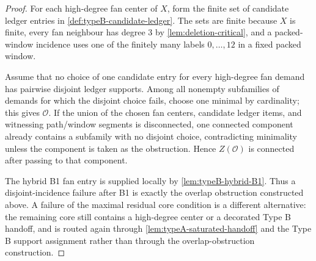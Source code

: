 \documentclass[11pt]{article}
\begin{document}
\begin{proof}
For each high-degree fan center of $X$, form the finite set of candidate ledger
entries in \cref{def:typeB-candidate-ledger}.  The sets are finite because $X$
is finite, every fan neighbour has degree $3$ by \cref{lem:deletion-critical},
and a packed-window incidence uses one of the finitely many labels
$0,\ldots,12$ in a fixed packed window.

Assume that no choice of one candidate entry for every high-degree fan demand
has pairwise disjoint ledger supports.  Among all nonempty subfamilies of demands for
which the disjoint choice fails, choose one minimal by cardinality; this gives
$\mathcal O$.  If the union of the chosen fan centers, candidate ledger items, and
witnessing path/window segments is disconnected, one connected component already
contains a subfamily with no disjoint choice, contradicting minimality unless
the component is taken as the obstruction.  Hence $Z(\mathcal O)$ is connected
after passing to that component.

The hybrid B1 fan entry is supplied locally by
\cref{lem:typeB-hybrid-B1}.  Thus a disjoint-incidence failure after B1 is exactly
the overlap obstruction constructed above.  A failure of the maximal residual
core condition is a different alternative: the remaining core still contains a
high-degree center or a decorated Type B handoff, and is routed again through
\cref{lem:typeA-saturated-handoff} and the Type B support assignment rather than
through the overlap-obstruction construction.
\end{proof}
\end{document}

